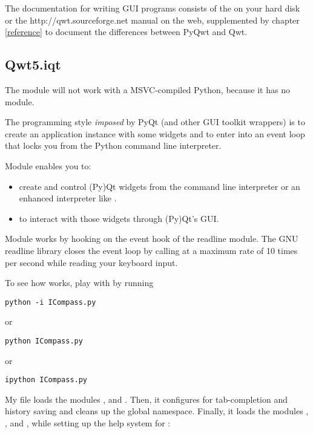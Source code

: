 \documentclass{manual}
\newcommand{\Qwt}{\ulink{Qwt}
  {http://qwt.sourceforge.net}}
\newcommand{\PyQwtLatestTarGz}{\ulink{PyQwt-5.0.1.tar.gz}
  {http://prdownloads.sourceforge.net/pyqwt/PyQwt-5.0.1.tar.gz?download}}
\newcommand{\Future}{
  \begin{notice}[warning]
    The documentation is for PyQwt-5.0.1 which has not yet been released. The
    latest release is \PyQwtLatestTarGz{} and refer to the documentation
    included in the latest release when using it.
  \end{notice}
}
\renewcommand{\Future}{}
\begin{document}
The documentation for writing GUI programs consists of the
 on your hard disk or the \Qwt{} manual on
the web, supplemented by chapter \ref{reference} to document the differences
between PyQwt and Qwt.


\subsection{Qwt5.iqt
  \label{iqt-intro}}

\Future{}

\begin{notice}[warning]
  The module  will not work with a MSVC-compiled Python,
  because it has no  module.
\end{notice}

The programming style \emph{imposed} by PyQt (and other GUI toolkit wrappers)
is to create an application instance with some widgets and to enter into an
event loop that locks you from the Python command line interpreter.

Module  enables you to:
\begin{itemize}
\item
  create and control (Py)Qt widgets from the command line interpreter or an
  enhanced interpreter like .
\item
  to interact with those widgets through (Py)Qt's GUI.
\end{itemize}

Module  works by hooking  on the
event hook of the readline module.
The GNU readline library closes the event loop by calling 
 at a maximum rate of 10 times per second
while reading your keyboard input.

To see how  works, play with  by running
\begin{verbatim}
python -i ICompass.py
\end{verbatim}
or
\begin{verbatim}
python ICompass.py
\end{verbatim}
or
\begin{verbatim}
ipython ICompass.py
\end{verbatim}

My  file loads the modules ,
 and .  Then, it configures 
for tab-completion and history saving and cleans up the global namespace.
Finally, it loads the modules , , and ,
while setting up the help system for :

\end{document}
